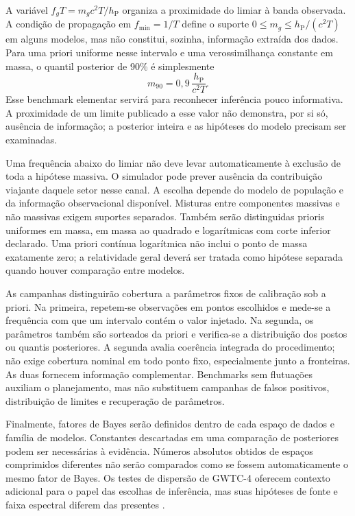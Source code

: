 A variável \(f_gT=m_gc^2T/h_{\mathrm P}\) organiza a proximidade do
limiar à banda observada. A condição de propagação em
\(f_{\min}=1/T\) define o suporte
\(0\leq m_g\leq h_{\mathrm P}/(c^2T)\) em alguns modelos, mas não
constitui, sozinha, informação extraída dos dados. Para uma priori
uniforme nesse intervalo e uma verossimilhança constante em massa, o
quantil posterior de 90\% é simplesmente
\begin{equation}
 m_{90}=0{,}9\,\frac{h_{\mathrm P}}{c^2T}.
 \label{eq:rev-priori-sem-informacao}
\end{equation}
Esse benchmark elementar servirá para reconhecer inferência pouco
informativa. A proximidade de um limite publicado a esse valor não
demonstra, por si só, ausência de informação; a posterior inteira e as
hipóteses do modelo precisam ser examinadas.

Uma frequência abaixo do limiar não deve levar automaticamente à
exclusão de toda a hipótese massiva. O simulador pode prever ausência
da contribuição viajante daquele setor nesse canal. A escolha depende
do modelo de população e da informação observacional disponível.
Misturas entre componentes massivas e não massivas exigem suportes
separados. Também serão distinguidas prioris uniformes em massa, em
massa ao quadrado e logarítmicas com corte inferior declarado. Uma
priori contínua logarítmica não inclui o ponto de massa exatamente zero;
a relatividade geral deverá ser tratada como hipótese separada quando
houver comparação entre modelos.

As campanhas distinguirão cobertura a parâmetros fixos de calibração
sob a priori. Na primeira, repetem-se observações em pontos escolhidos
e mede-se a frequência com que um intervalo contém o valor injetado.
Na segunda, os parâmetros também são sorteados da priori e verifica-se
a distribuição dos postos ou quantis posteriores. A segunda avalia
coerência integrada do procedimento; não exige cobertura nominal em
todo ponto fixo, especialmente junto a fronteiras. As duas fornecem
informação complementar. Benchmarks sem flutuações auxiliam o
planejamento, mas não substituem campanhas de falsos positivos,
distribuição de limites e recuperação de parâmetros.

Finalmente, fatores de Bayes serão definidos dentro de cada espaço de
dados e família de modelos. Constantes descartadas em uma comparação
de posteriores podem ser necessárias à evidência. Números absolutos
obtidos de espaços comprimidos diferentes não serão comparados como
se fossem automaticamente o mesmo fator de Bayes. Os testes de
dispersão de GWTC-4 oferecem contexto adicional para o papel das
escolhas de inferência, mas suas hipóteses de fonte e faixa espectral
diferem das presentes \autocite{lvk2026}.

